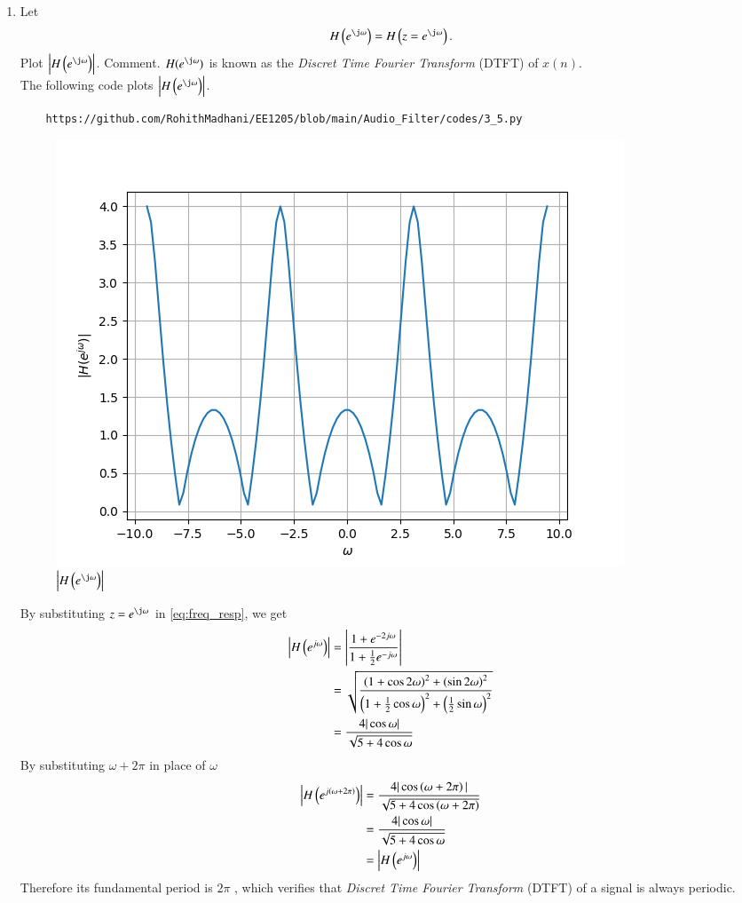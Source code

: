 \documentclass[journal,12pt,twocolumn]{IEEEtran}
\theoremstyle{remark}
\begin{document}
\begin{enumerate}[label=\thesection.\arabic*]
\item 
Let
\begin{equation}
H\brak{e^{\j \omega}} = H\brak{z = e^{\j \omega}}.
\end{equation}
Plot $\abs{H\brak{e^{\j \omega}}}$.  Comment.  $H(e^{\j \omega})$ is
known as the {\em Discret Time Fourier Transform} (DTFT) of $x(n)$.
\\
\solution The following code plots $\abs{H\brak{e^{\j \omega}}}$.
\begin{lstlisting}
    https://github.com/RohithMadhani/EE1205/blob/main/Audio_Filter/codes/3_5.py
\end{lstlisting}
\begin{figure}[H]
    \includegraphics[width=0.8\columnwidth]{figs/3_5.png}
    \caption{$\abs{H\brak{e^{\j \omega}}}$}
    \label{fig:3.5_plot}
\end{figure}
By substituting $z = e^{\j \omega}$ in \eqref{eq:freq_resp}, we get
\begin{align}
	\left|H\left(e^{j\omega}\right)\right| &= \left|\frac{1 + e^{-2j\omega}}{1 + \frac{1}{2}e^{-j\omega}}\right| \\
									  &= \sqrt{\frac{\left(1 + \cos{2\omega}\right)^2 + \left(\sin{2\omega}\right)^2}{\left(1 + \frac{1}{2}\cos{\omega}\right)^2 + \left(\frac{1}{2}\sin{\omega}\right)^2}}\\
									  &= \frac{4|\cos{\omega}|}{\sqrt{5 + 4\cos{\omega}}}
\end{align}
By substituting $\omega + 2\pi$ in place of $\omega$
\begin{align}
	\left|H\left(e^{j\left(\omega + 2\pi\right)}\right)\right| &= \frac{4|\cos\left(\omega + 2\pi\right)|}{\sqrt{5 + 4\cos\left(\omega + 2\pi\right)}} \\
											   &= \frac{4|\cos{\omega}|}{\sqrt{5 + 4\cos{\omega}}} \\
											   &= \left|H\left(e^{j\omega}\right)\right|	
\end{align}
Therefore its fundamental period is $2\pi$ , which verifies that {\em Discret Time Fourier Transform} (DTFT) of a signal is always periodic.

\end{enumerate}
\end{document}
